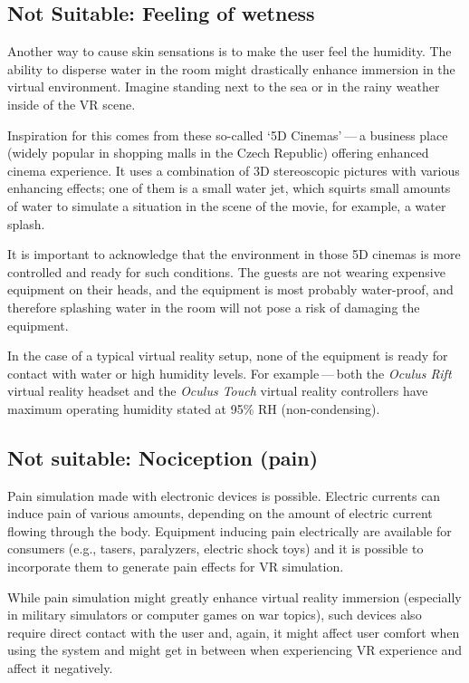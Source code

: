 \hypertarget{x-not-suitable:-feeling-of-wetness}{\subsection{Not Suitable: Feeling of wetness}}
Another way to cause skin sensations is to make the user feel the humidity.
The ability to disperse water in the room might drastically enhance immersion
in the virtual environment. Imagine standing next to the sea or in the rainy weather
inside of the VR scene.

Inspiration for this comes from these so-called `5D Cinemas' — a business
place (widely popular in shopping malls in the Czech Republic) offering
enhanced cinema experience. It uses a combination of 3D stereoscopic
pictures with various enhancing effects; one of them is a small water jet, 
which squirts small amounts of water to simulate a
situation in the scene of the movie, for example, a water splash.\,\cite{5dcin}


It is important to acknowledge that the environment in those 5D cinemas
is more controlled and ready for such conditions. The guests are not
wearing expensive equipment on their heads, and the equipment is
most probably water-proof, and therefore splashing water in the room will not
pose a risk of damaging the equipment.


In the case of a typical virtual reality setup, none of the equipment is ready
for contact with water or high humidity levels. For example — both the
\emph{Oculus Rift} virtual reality headset and the \emph{Oculus Touch} virtual reality
controllers have maximum operating humidity stated at 95\% RH (non-condensing).
\cite{orhswg}


\hypertarget{x-not-suitable:-nociception-(pain)}{\subsection{Not suitable: Nociception (pain)}}
Pain simulation made with electronic devices is possible. Electric currents can
induce pain of various amounts, depending on the amount of electric current
flowing through the body.
Equipment inducing pain electrically are available for consumers
(e.g., tasers, paralyzers, electric shock toys) and it is possible to
incorporate them to generate pain effects for VR simulation.


While pain simulation might greatly enhance virtual reality immersion
(especially in military simulators or computer games on war topics),
such devices also require direct contact with the user and, again,
it might affect user comfort when using the system and might get in between
when experiencing VR experience and affect it negatively.


